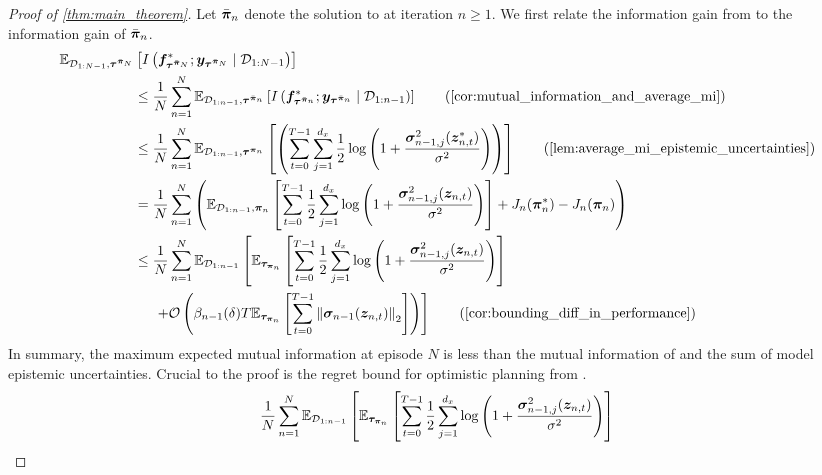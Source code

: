 \begin{proof}[Proof of  \cref{thm:main_theorem}]
Let $\bar{{\bm{\pi}}}_n$ denote the solution to  at iteration $n\geq 1$. We first relate the information gain from \opacex to the information gain of $\bar{{\bm{\pi}}}_n$.
    \begin{align*}
        \E_{\setD_{1:N-1}, \vtau^{\bar{\vpi}_N}}&\left[I\left(\vf^*_{\vtau^{\bar{\vpi}_N}}; \vy_{\vtau^{\bar{\vpi}_N}} \mid \setD_{1:N-1}\right)\right] \\
        &\leq \frac{1}{N}\sum^{N}_{n=1} \E_{\setD_{1:n-1}, \vtau^{\bar{\vpi}_n}}\left[I\left(\vf^*_{\vtau^{\bar{\vpi}_n}}; \vy_{\vtau^{\bar{\vpi}_n}} \mid \setD_{1:n-1}\right)\right] \tag{\Cref{cor:mutual_information_and_average_mi}}\\
        &\leq \frac{1}{N}  \sum^{N}_{n=1} \E_{\setD_{1:n-1}, \vtau^{\vpi_n}}\left[\left(\sum_{t=0}^{T-1} \sum^{d_x}_{j=1}\frac{1}{2} \log \left(1 + \frac{\vsigma_{n-1, j}^2(\vz^*_{n, t})}{\sigma^2}\right)\right)\right] \tag{\Cref{lem:average_mi_epistemic_uncertainties}} \\
        &= \frac{1}{N}  \sum^{N}_{n=1} \left(\E_{\setD_{1:n-1}, \vpi_n}\left[\sum_{t=0}^{T-1} \frac{1}{2} \sum^{d_x}_{j=1}\log \left(1 + \frac{\vsigma_{n-1, j}^2(\vz_{n, t})}{\sigma^2}\right)\right] + J_n(\vpi_n^*) - J_n(\vpi_n) \right) \\
        &\leq \frac{1}{N}  \sum^{N}_{n=1} \E_{\setD_{1:n-1}}\left[\E_{\vtau_{\vpi_n}}\left[\sum_{t=0}^{T-1} \frac{1}{2} \sum^{d_x}_{j=1}\log \left(1 + \frac{\vsigma_{n-1, j}^2(\vz_{n, t})}{\sigma^2}\right)\right] \right. \\
        &\left. \hspace{0.5cm} + \setO\left(\beta_{n-1}(\delta) T \E_{\vtau_{\vpi_n}}\left[\sum^{T-1}_{t=0}  \norm{\vsigma_{n-1}(\vz_{n, t})}_2 \right]\right)\right] \tag{\Cref{cor:bounding_diff_in_performance}}
        \end{align*}
                    In summary, the maximum expected mutual information at episode $N$ is less than the mutual information of \opacex and the sum of model epistemic uncertainties. Crucial to the proof is the regret bound for optimistic planning from . 
        \begin{align*}
        &\frac{1}{N}  \sum^{N}_{n=1} \E_{\setD_{1:n-1}}\left[\E_{\vtau_{\vpi_n}}\left[\sum_{t=0}^{T-1} \frac{1}{2} \sum^{d_x}_{j=1}\log \left(1 + \frac{\vsigma_{n-1, j}^2(\vz_{n, t})}{\sigma^2}\right)\right] \right.\\

\end{align*}
\end{proof}
